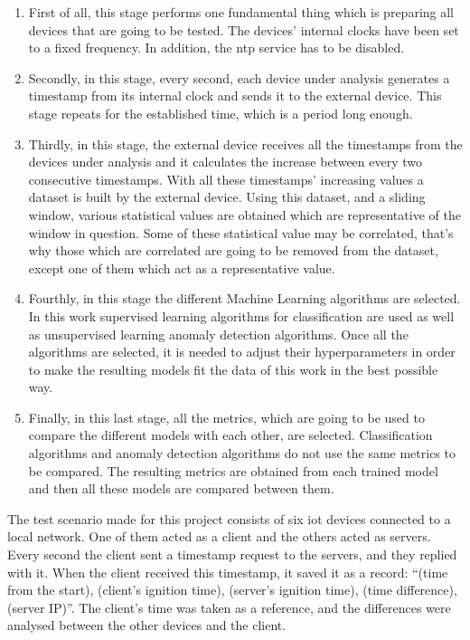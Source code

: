\begin{enumerate}[label=\Alph*)]
    \item First of all, this stage performs one fundamental thing which is preparing all devices that are going to be tested. The devices' internal clocks have been set to a fixed frequency. In addition, the \acrshort{ntp} service has to be disabled. 
    \item Secondly, in this stage, every second, each device under analysis generates a timestamp from its internal clock and sends it to the external device. This stage repeats for the established time, which is a period long enough. 
    \item Thirdly, in this stage, the external device receives all the timestamps from the devices under analysis and it calculates the increase between every two consecutive timestamps. With all these timestamps' increasing values a dataset is built by the external device. Using this dataset, and a sliding window, various statistical values are obtained which are representative of the window in question. Some of these statistical value may be correlated, that's why those which are correlated are going to be removed from the dataset, except one of them which act as a representative value.
    \item Fourthly, in this stage the different Machine Learning algorithms are selected. In this work supervised learning algorithms for classification are used as well as unsupervised learning anomaly detection algorithms. Once all the algorithms are selected, it is needed to adjust their hyperparameters in order to make the resulting models fit the data of this work in the best possible way.
    \item Finally, in this last stage, all the metrics, which are going to be used to compare the different models with each other, are selected. Classification algorithms and anomaly detection algorithms do not use the same metrics to be compared. The resulting metrics are obtained from each trained model and then all these models are compared between them.
\end{enumerate}


The test scenario made for this project consists of six \acrshort{iot} devices connected to a local network. One of them acted as a client and the others acted as servers. Every second the client sent a timestamp request to the servers, and they replied with it. When the client received this timestamp, it saved it as a record: ``(time from the start), (client's ignition time), (server's ignition time), (time difference), (server IP)''. The client's time was taken as a reference, and the differences were analysed between the other devices and the client.


